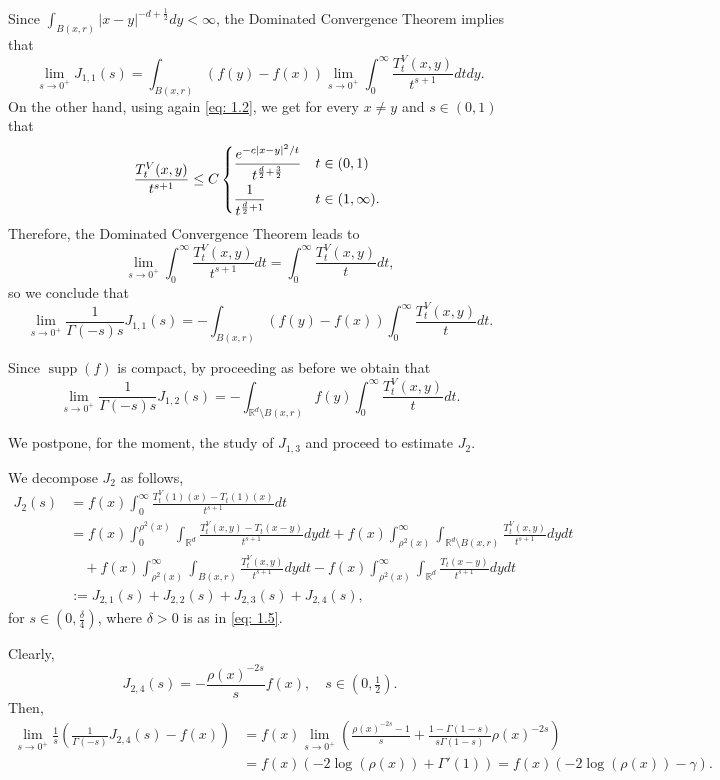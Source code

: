\documentclass[10pt, a4paper, reqno]{amsart}
\theoremstyle{definition}
\theoremstyle{remark}
\DeclareMathOperator{\supp}{supp}
\newcommand{\RR}{\mathbb{R}}
\numberwithin{equation}{section}
\begin{document}
Since $\int_{B(x,r)} |x-y|^{-d+\frac12}dy<\infty$, the Dominated Convergence Theorem implies that
\[\lim_{s\to 0^+} J_{1,1}(s)=\int_{B(x,r)} (f(y)-f(x)) \lim_{s\to 0^+} \int_0^\infty \frac{T_t^V(x,y)}{t^{s+1}}dt dy.\]
On the other hand, using again \eqref{eq: 1.2}, we get for every $x\neq y$ and $s\in (0,1)$ that
\[\frac{T_t^V(x,y)}{t^{s+1}}\leq C\begin{dcases*} \frac{e^{-c|x-y|^2/t}}{t^{\frac d2 +\frac32}} & $t\in (0,1)$\\ 
\frac{1}{t^{\frac d2 +1}} & $t\in (1,\infty).$
\end{dcases*}\]
Therefore, the Dominated Convergence Theorem leads to
\[\lim_{s\to 0^+} \int_0^\infty \frac{T_t^V(x,y)}{t^{s+1}}dt=\int_0^\infty \frac{T_t^V(x,y)}{t}dt,\]
so we conclude that
\[\lim_{s\to 0^+} \frac{1}{\Gamma(-s)s} J_{1,1}(s)=-\int_{B(x,r)} (f(y)-f(x))\int_0^\infty \frac{T_t^V(x,y)}{t}dt.\]

Since $\supp(f)$ is compact, by proceeding as before we obtain that
\[\lim_{s\to 0^+} \frac{1}{\Gamma(-s)s} J_{1,2}(s)=-\int_{\RR^d\setminus B(x,r)} f(y)\int_0^\infty \frac{T_t^V(x,y)}{t}dt.\]

We postpone, for the moment, the study of $J_{1,3}$ and proceed to estimate $J_2$.

We decompose $J_2$ as follows,
\begin{align*}
    J_2(s)&=f(x)\int_0^\infty \frac{T_t^V(1)(x)-T_t(1)(x)}{t^{s+1}}dt\\
    &=f(x)\int_0^{\rho^2(x)} \int_{\RR^d} \frac{T_t^V(x,y)-T_t(x-y)}{t^{s+1}}dydt +f(x)\int_{\rho^2(x)}^\infty \int_{\RR^d\setminus B(x,r)} \frac{T_t^V(x,y)}{t^{s+1}}dydt\\
    &\quad +{f(x)}\int_{\rho^2(x)}^\infty \int_{B(x,r)} \frac{T_t^V(x,y)}{t^{s+1}}dydt-f(x)\int_{\rho^2(x)}^\infty \int_{\RR^d} \frac{T_t(x-y)}{t^{s+1}}dydt\\
    &:=J_{2,1}(s)+J_{2,2}(s)+J_{2,3}(s)+J_{2,4}(s), 
\end{align*}
for $s\in \left(0,\frac{\delta}{4}\right)$, where $\delta>0$ is as in \eqref{eq: 1.5}.

Clearly, 
\[J_{2,4}(s)=-\frac{\rho(x)^{-2s}}{s}f(x), \quad s\in \left(0,\tfrac12\right).\]
Then,
\begin{align*}
    \lim_{s\to 0^+} \frac1s\left(\frac{1}{\Gamma(-s)}J_{2,4}(s)-f(x)\right)&=f(x)\lim_{s\to 0^+} \left(\frac{\rho(x)^{-2s}-1}{s}+\frac{1-\Gamma(1-s)}{s\Gamma(1-s)}\rho(x)^{-2s}\right)\\
    &=f(x)\left(-2\log(\rho(x))+\Gamma'(1)\right)=f(x)\left(-2\log(\rho(x))-\gamma\right).
\end{align*}
\end{document}
